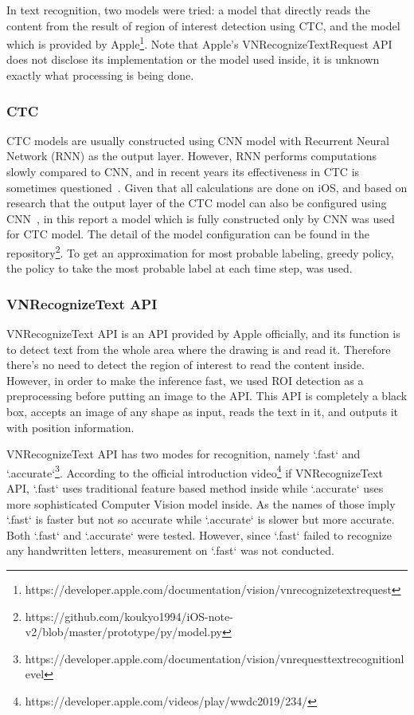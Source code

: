 In text recognition, two models were tried: a model that directly reads the content from the
result of region of interest detection using CTC, and the model which is provided by
Apple\footnote{https://developer.apple.com/documentation/vision/vnrecognizetextrequest}.
Note that Apple's VNRecognizeTextRequest API does not disclose its implementation or
the model used inside, it is unknown exactly what processing is being done.

\subsubsection{CTC}

CTC models are usually constructed using CNN model with Recurrent Neural Network (RNN)
as the output layer.
However, RNN performs computations slowly compared to CNN,
and in recent years its effectiveness in CTC is sometimes questioned~\cite{puigcerver2017multidimensional}.
Given that all calculations are done on iOS, and based on research that the
output layer of the CTC model can also be configured using CNN~\cite{gao2017reading}, in this report
a model which is fully constructed only by CNN was used for CTC model. The detail of the
model configuration can be found in the repository\footnote{https://github.com/koukyo1994/iOS-note-v2/blob/master/prototype/py/model.py}.
To get an approximation for most probable labeling, greedy policy, the policy to take the
most probable label at each time step, was used.

\subsubsection{VNRecognizeText API}
VNRecognizeText API is an API provided by Apple officially,
and its function is to detect text from the whole area where the drawing is and read it.
Therefore there's no need to detect the region of interest to read the content inside.
However, in order to make the inference fast, we used ROI detection as a preprocessing before
putting an image to the API.
This API is completely a black box, accepts an image of any shape as input,
reads the text in it, and outputs it with position information.

VNRecognizeText API has two modes for recognition, namely `.fast` and `.accurate`\footnote{https://developer.apple.com/documentation/vision/vnrequesttextrecognitionlevel}.
According to the official introduction video\footnote{https://developer.apple.com/videos/play/wwdc2019/234/}
if VNRecognizeText API, `.fast` uses traditional feature based method inside while
`.accurate` uses more sophisticated Computer Vision model inside. As the names of those imply
`.fast` is faster but not so accurate while `.accurate` is slower but more accurate. Both `.fast` and `.accurate`
were tested. However, since `.fast` failed to recognize any handwritten letters, measurement on `.fast` was not conducted.
